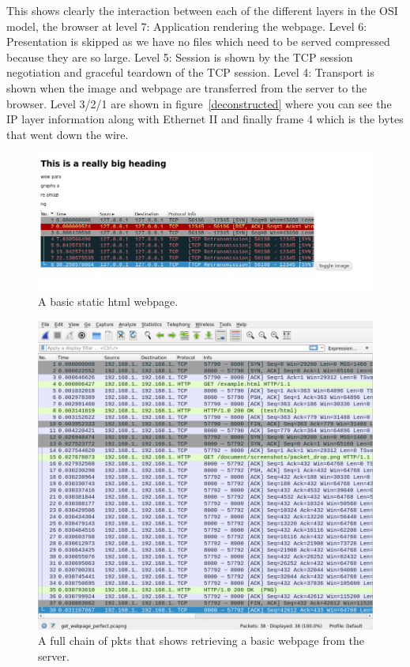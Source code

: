 \documentclass[titlepage]{article}
\begin{document}
This shows clearly the interaction between each of the different layers in the OSI model,
the browser at level 7: Application rendering the webpage. Level 6: Presentation is skipped as
we have no files which need to be served compressed because they are so large. Level 5: Session
is shown by the TCP session negotiation and graceful teardown of the TCP session. Level 4: Transport
is shown when the image and webpage are transferred from the server to the browser. Level 3/2/1
are shown in figure~\ref{deconstructed} where you can see the IP layer information along with
Ethernet II and finally frame 4 which is the bytes that went down the wire.

\begin{figure}[H]
  \centering
  \includegraphics[width=\textwidth]{screenshots/basic_webpage.png}
  \caption{%
    A basic static \gls{html} webpage.
  }\label{basicwebpage}
\end{figure}

\begin{figure}[H]
  \centering
  \includegraphics[width=\textwidth]{screenshots/website_get.png}
  \caption{%
    A full chain of \glspl{pkt} that shows retrieving a basic webpage
    from the server.
  }\label{getrequest}
\end{figure}
\end{document}
